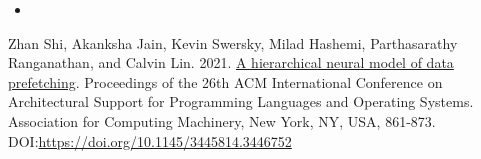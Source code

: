 \documentclass [12pt]{article}
\begin{document}
\begin{itemize}
            \item 
        \end{itemize}

\begin{thebibliography}{1}
    Zhan Shi, Akanksha Jain, Kevin Swersky, Milad Hashemi, Parthasarathy Ranganathan, and Calvin Lin. 2021. \href{https://www.cs.utexas.edu/~akanksha/asplos21.pdf}{A hierarchical neural model of data prefetching}. Proceedings of the 26th ACM International Conference on Architectural Support for Programming Languages and Operating Systems. Association for Computing Machinery, New York, NY, USA, 861-873. DOI:\url{https://doi.org/10.1145/3445814.3446752}
\end{thebibliography}
\end{document}
